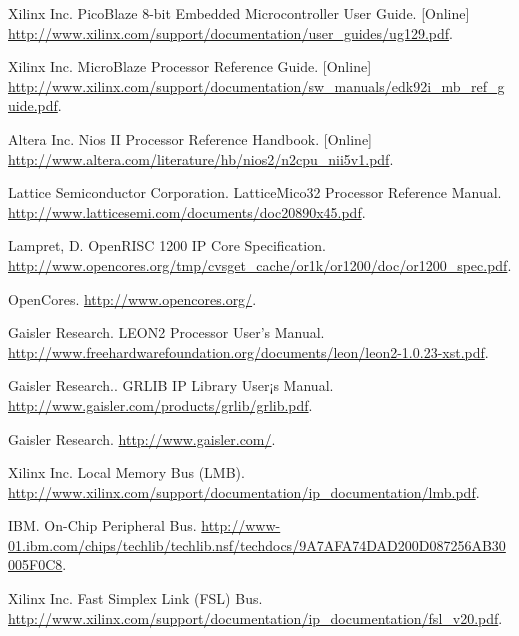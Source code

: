 \documentclass[a4paper,12pt]{report}
\begin{document}
\begin{thebibliography}{99}




Xilinx Inc. PicoBlaze 8-bit Embedded Microcontroller User Guide. [Online] \url{http://www.xilinx.com/support/documentation/user_guides/ug129.pdf}.

 Xilinx Inc. MicroBlaze Processor Reference Guide. [Online] \url{http://www.xilinx.com/support/documentation/sw_manuals/edk92i_mb_ref_guide.pdf}.

 Altera Inc. Nios II Processor Reference Handbook. [Online] \url{http://www.altera.com/literature/hb/nios2/n2cpu_nii5v1.pdf}.

Lattice Semiconductor Corporation. LatticeMico32 Processor Reference Manual. 
\url{http://www.latticesemi.com/documents/doc20890x45.pdf}.

Lampret, D. OpenRISC 1200 IP Core Specification. \url{http://www.opencores.org/tmp/cvsget_cache/or1k/or1200/doc/or1200_spec.pdf}.

OpenCores. \url{http://www.opencores.org/}.

Gaisler Research. LEON2 Processor User's Manual. 
\url{http://www.freehardwarefoundation.org/documents/leon/leon2-1.0.23-xst.pdf}.

Gaisler Research.. GRLIB IP Library User¡s Manual. \url{http://www.gaisler.com/products/grlib/grlib.pdf}.

 Gaisler Research. \url{http://www.gaisler.com/}.

 Xilinx Inc. Local Memory Bus (LMB). \url{http://www.xilinx.com/support/documentation/ip_documentation/lmb.pdf}.

IBM. On-Chip Peripheral Bus.  \url{http://www-01.ibm.com/chips/techlib/techlib.nsf/techdocs/9A7AFA74DAD200D087256AB30005F0C8}.

 Xilinx Inc. Fast Simplex Link (FSL) Bus.  \url{http://www.xilinx.com/support/documentation/ip_documentation/fsl_v20.pdf}.


\end{thebibliography}
\end{document}
